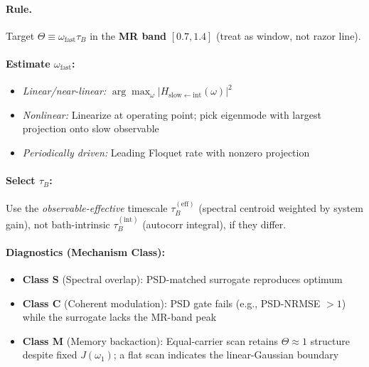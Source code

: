 \documentclass[11pt,letterpaper]{article}
\begin{document}
\begin{tcolorbox}[colback=blue!5!white,colframe=blue!75!black,title=Design Card: Memory-Resonance Condition ($\Theta \approx 1$)]

\paragraph*{Rule.} Target $\Theta \equiv \omega_{\mathrm{fast}} \tau_B$ in the \textbf{MR band} $[0.7, 1.4]$ (treat as window, not razor line).

\paragraph*{Estimate $\omega_{\mathrm{fast}}$:}
\begin{itemize}[nosep,leftmargin=*]
\item \emph{Linear/near-linear:} $\arg\max_\omega |H_{\mathrm{slow}\leftarrow\mathrm{int}}(\omega)|^2$
\item \emph{Nonlinear:} Linearize at operating point; pick eigenmode with largest projection onto slow observable
\item \emph{Periodically driven:} Leading Floquet rate with nonzero projection
\end{itemize}

\paragraph*{Select $\tau_B$:}
Use the \emph{observable-effective} timescale $\tau_B^{(\mathrm{eff})}$ (spectral centroid weighted by system gain), not bath-intrinsic $\tau_B^{(\mathrm{int})}$ (autocorr integral), if they differ.

\paragraph*{Diagnostics (Mechanism Class):}
\begin{itemize}[nosep,leftmargin=*]
\item \textbf{Class S} (Spectral overlap): PSD-matched surrogate reproduces optimum
\item \textbf{Class C} (Coherent modulation): PSD gate fails (e.g., PSD-NRMSE $>1$) while the surrogate lacks the MR-band peak
\item \textbf{Class M} (Memory backaction): Equal-carrier scan retains $\Theta\!\approx\!1$ structure despite fixed $J(\omega_1)$; a flat scan indicates the linear-Gaussian boundary
\end{itemize}


\end{tcolorbox}
\end{document}
